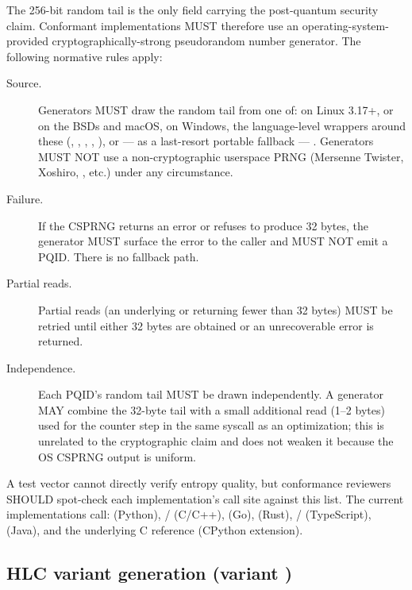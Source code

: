 The 256-bit random tail is the only field carrying the post-quantum security claim. Conformant implementations MUST therefore use an operating-system-provided cryptographically-strong pseudorandom number generator. The following normative rules apply:

\begin{description}
  \item[Source.] Generators MUST draw the random tail from one of:  on Linux 3.17+,  or  on the BSDs and macOS,  on Windows, the language-level wrappers around these (, , , , ), or — as a last-resort portable fallback — . Generators MUST NOT use a non-cryptographic userspace PRNG (Mersenne Twister, Xoshiro, , etc.) under any circumstance.
  \item[Failure.] If the CSPRNG returns an error or refuses to produce 32 bytes, the generator MUST surface the error to the caller and MUST NOT emit a PQID. There is no fallback path.
  \item[Partial reads.] Partial reads (an underlying  or  returning fewer than 32 bytes) MUST be retried until either 32 bytes are obtained or an unrecoverable error is returned.
  \item[Independence.] Each PQID's random tail MUST be drawn independently. A generator MAY combine the 32-byte tail with a small additional read (1--2 bytes) used for the counter step in the same syscall as an optimization; this is unrelated to the cryptographic claim and does not weaken it because the OS CSPRNG output is uniform.
\end{description}

\noindent A test vector cannot directly verify entropy quality, but conformance reviewers SHOULD spot-check each implementation's call site against this list. The current implementations call:  (Python), / (C/C++),  (Go),  (Rust), / (TypeScript),  (Java), and the underlying C reference (CPython extension).

\subsection{HLC variant generation (variant )}

